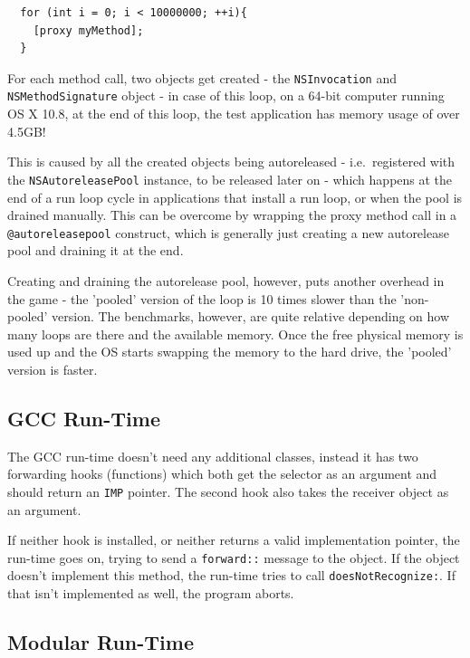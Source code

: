 \begin{verbatim}
  for (int i = 0; i < 10000000; ++i){
    [proxy myMethod];
  }
\end{verbatim}

For each method call, two objects get created - the \verb=NSInvocation= \newline{}and \verb=NSMethodSignature= object - in case of this loop, on a 64-bit computer running OS X 10.8, at the end of this loop, the test application has memory usage of over 4.5GB!

This is caused by all the created objects being autoreleased - i.e.\ registered with the \verb=NSAutoreleasePool= instance, to be released later on - which happens at the end of a run loop cycle in applications that install a run loop, or when the pool is drained manually. This can be overcome by wrapping the proxy method call in a \verb=@autoreleasepool= construct, which is generally just creating a new autorelease pool and draining it at the end.

Creating and draining the autorelease pool, however, puts another overhead in the game - the 'pooled' version of the loop is 10 times slower than the 'non-pooled' version. The benchmarks, however, are quite relative depending on how many loops are there and the available memory. Once the free physical memory is used up and the OS starts swapping the memory to the hard drive, the 'pooled' version is faster.

\subsection{GCC Run-Time}

The GCC run-time doesn't need any additional classes, instead it has two forwarding hooks (functions) which both get the selector as an argument and should return an \verb=IMP= pointer. The second hook also takes the receiver object as an argument.

If neither hook is installed, or neither returns a valid implementation pointer, the run-time goes on, trying to send a \verb=forward::= message to the object. If the object doesn't implement this method, the run-time tries to call \verb=doesNotRecognize:=. If that isn't implemented as well, the program aborts.

\subsection{Modular Run-Time}
 
